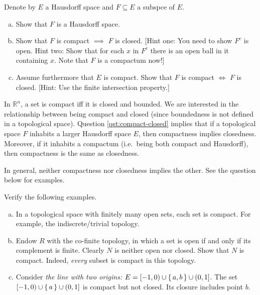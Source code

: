 \begin{qst}\label{qst:compact-closed}
  Denote by $E$ a Hausdorff space and $F \subseteq E$ a  subspce of $E$.
  \begin{enumerate}[(a)]
    \item Show that $F$ is a Hausdorff space.
    \item Show that $F$ is compact $\implies$ $F$ is closed. [Hint one: You need to show $F^c$ is open. Hint two: Show that for each $x$ in $F^c$ there is an open ball in it containing $x$. Note that $F$ is a compactum now!]
    \item Assume furthermore that $E$ is compact. Show that    $F$ is compact $\iff$ $F$ is closed. [Hint: Use the finite intersection property.]
  \end{enumerate}
\end{qst}

%
%

In $\mathbb R^n$, a set is compact iff it is closed and bounded.
We are interested in the relationship between being compact and closed
(since boundedness is not defined in a topological space).
Question \ref{qst:compact-closed} implies that if a topological space $F$ inhabits a larger Hausdorff space $E$,
then compactness implies closedness.
Moreover, if it inhabits a compactum (i.e.\ being both compact and Hausdorff),
then compactness is the same as closedness.

In general, neither compactness nor closedness implies the other.
See the question below for examples.

\begin{qst}
   Verify the following examples.
   \begin{enumerate}[(a)]
     \item In a topological space with finitely many open sets, each set is compact. For example, the indiscrete/trivial topology.
     \item Endow $R$ with the co-finite topology, in which
        a set is open if and only if its complement is finite. Clearly $N$ is neither open nor closed. 
        Show that $N$ is compact. Indeed, \textit{every} subset is compact in this topology.
     \item Consider \textit{the line with two origins:}
        $E = [-1,0) \cup \set{a,b} \cup (0,1]$. The set 
        $[-1,0) \cup \set{a} \cup (0,1]$ is compact but not closed. Its closure includes point $b$.
   \end{enumerate}
\end{qst}

